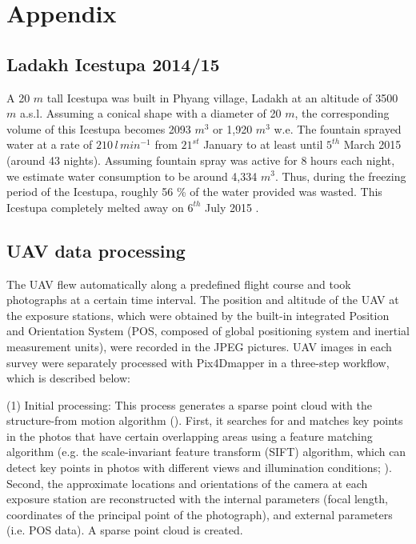 \documentclass[utf8]{frontiersSCNS} %
\begin{document}
\section{Appendix}

\subsection{Ladakh Icestupa 2014/15} \label{sec:ladakhloss}

A 20 $m$ tall Icestupa \citep{iceheight} was built in Phyang village, Ladakh at an altitude of 3500 $m$ a.s.l.
Assuming a conical shape with a diameter of 20 $m$, the corresponding volume of this Icestupa becomes 2093 $m^3$ or
1,920 $m^3$ w.e. The fountain sprayed water at a rate of $210\, l\,min^{-1}$ \citep{waterinput} from $21^{st}$
January \citep{waterstart} to at least until $5^{th}$ March 2015 \citep{waterend} (around 43 nights). Assuming
fountain spray was active for 8 hours each night, we estimate water consumption to be around 4,334 $m^3$. Thus,
during the freezing period of the Icestupa, roughly 56 \% of the water provided was wasted.  This Icestupa
completely melted away on $6^{th}$ July 2015 \citep{iceends}.

\subsection{UAV data processing} \label{sec:uav}
The UAV flew automatically along a predefined flight course and took photographs at a certain time interval. The position and
altitude of the UAV at the exposure stations, which were obtained by the built-in integrated Position and
Orientation System (POS, composed of global positioning system and inertial measurement units), were recorded in
the JPEG pictures. UAV images in each survey were separately processed with Pix4Dmapper in a three-step workflow,
which is described below:

(1) Initial processing: This process generates a sparse point cloud with the structure-from motion algorithm
(\cite{Turner_2012}). First, it searches for and matches key points in the photos that have certain overlapping
areas using a feature matching algorithm (e.g. the scale-invariant feature transform (SIFT) algorithm, which can
detect key points in photos with different views and illumination conditions; \cite{Lowe_2004}). Second, the
approximate locations and orientations of the camera at each exposure station are reconstructed with the internal
parameters (focal length, coordinates of the principal point of the photograph), and external parameters (i.e. POS
data). A sparse point cloud is created.
\end{document}
